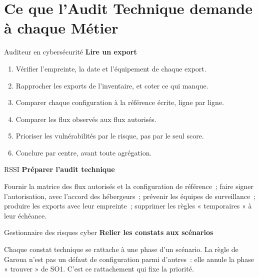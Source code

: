 \section{Ce que l'Audit Technique demande à chaque Métier}
\label{sec:c12-metiers}

\begin{boxmetier}{Auditeur en cybersécurité}
\textbf{Lire un export}
\begin{enumerate}
    \item Vérifier l'empreinte, la date et l'équipement de chaque export.
    \item Rapprocher les exports de l'inventaire, et coter \NEK{} ce qui
          manque.
    \item Comparer chaque configuration à la référence écrite, ligne par
          ligne.
    \item Comparer les flux observés aux flux autorisés.
    \item Prioriser les vulnérabilités par le risque, pas par le seul score.
    \item Conclure par centre, avant toute agrégation.
\end{enumerate}
\end{boxmetier}

\begin{boxmetier}{RSSI}
\textbf{Préparer l'audit technique}

Fournir la matrice des flux autorisés et la configuration de référence~;
faire signer l'autorisation, avec l'accord des hébergeurs~; prévenir les
équipes de surveillance~; produire les exports avec leur empreinte~;
supprimer les règles « temporaires » à leur échéance.
\end{boxmetier}

\begin{boxmetier}{Gestionnaire des risques cyber}
\textbf{Relier les constats aux scénarios}

Chaque constat technique se rattache à une phase d'un scénario. La règle
de Garoua n'est pas un défaut de configuration parmi d'autres~: elle annule
la phase « trouver » de SO1. C'est ce rattachement qui fixe la priorité.
\end{boxmetier}

\separateur

